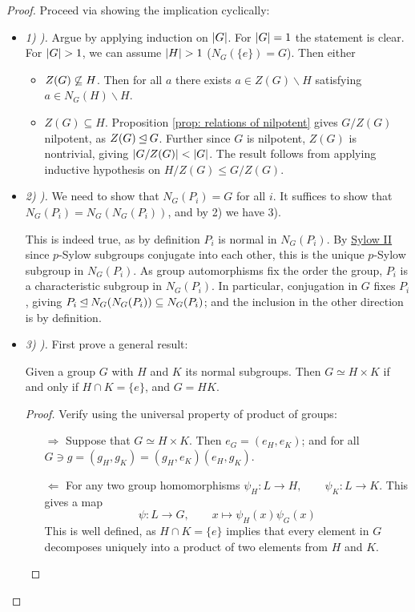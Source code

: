 \begin{proof}
    Proceed via showing the implication cyclically:
    \begin{itemize}
        \item \emph{1) ).} Argue by applying induction on $\left|G\right|$. For $\left|G\right| = 1$ the statement is clear. For $\left|G\right| > 1$, we can assume $\left|H\right| > 1$ ($N_G(\{e\}) = G$). Then either
        \begin{itemize}
            \item $Z(G) \centernot \subseteq H$. Then for all $a$ there exists $a \in Z(G) \smallsetminus H$ satisfying $a \in N_G(H) \smallsetminus H$.
            \item $Z(G) \subseteq H$. Proposition \ref{prop: relations of nilpotent} gives $G/Z(G)$ nilpotent, as $Z(G) \unlhd G$. Further since $G$ is nilpotent, $Z(G)$ is nontrivial, giving $\left|G/Z(G)\right| < \left|G\right|$. The result follows from applying inductive hypothesis on $H/Z(G) \leq G/Z(G)$.
        \end{itemize}
        \item \emph{2) ).} We need to show that $N_G(P_i) = G$ for all $i$. It suffices to show that $N_G(P_i) = N_G(N_G(P_i))$, and by 2) we have 3).
        
        This is indeed true, as by definition $P_i$ is normal in $N_G(P_i)$. By \hyperref[thm: Sylow II]{Sylow II} since $p$-Sylow subgroups conjugate into each other, this is the unique $p$-Sylow subgroup in $N_G(P_i)$. As group automorphisms fix the order the group, $P_i$ is a characteristic subgroup in $N_G(P_i)$. In particular, conjugation in $G$ fixes $P_i$, giving $P_i \unlhd N_G(N_G(P_i)) \subseteq N_G(P_i)$; and the inclusion in the other direction is by definition.
        \item \emph{3) ).} First prove a general result:
        
        \begin{parenthesis}
            Given a group $G$ with $H$ and $K$ its normal subgroups. Then $G \simeq H \times K$ if and only if $H \cap K = \{e\}$, and $G = HK$.
        \end{parenthesis}

        \begin{proof}
            Verify using the universal property of product of groups:
            \begin{enumerate}
                \item[$\Rightarrow$] Suppose that $G \simeq H \times K$. Then $e_G = (e_H, e_K)$; and for all $G \ni g = (g_H, g_K) = (g_H, e_K) (e_H, g_K)$.
                \item[$\Leftarrow$] For any two group homomorphisms $\psi_H: L \to H, \qquad \psi_K: L \to K$. This gives a map 
                \[
                    \psi: L \to G, \qquad x \mapsto \psi_H(x) \psi_G(x)
                \]
                This is well defined, as $H \cap K = \{e\}$ implies that every element in $G$ decomposes uniquely into a product of two elements from $H$ and $K$.
            \end{enumerate}
        \end{proof}


\end{itemize}
\end{proof}
